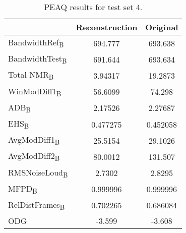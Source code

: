 \begin{table}\begin{center} %
\caption{PEAQ results for test set 4.}
\label{tab:PEAQdata2}
\begin{tabular}{|l|c|c|}
  \hline
                                    & Reconstruction & Original \\ \hline
  BandwidthRef\textsubscript{B}     & 694.777        & 693.638 \\
  BandwidthTest\textsubscript{B}    & 691.644        & 693.634 \\
  Total NMR\textsubscript{B}        & 3.94317        & 19.2873 \\
  WinModDiff1\textsubscript{B}      & 56.6099        & 74.298  \\
  ADB\textsubscript{B}              & 2.17526        & 2.27687 \\
  EHS\textsubscript{B}              & 0.477275       & 0.452058\\
  AvgModDiff1\textsubscript{B}      & 25.5154        & 29.1026 \\
  AvgModDiff2\textsubscript{B}      & 80.0012        & 131.507 \\
  RMSNoiseLoud\textsubscript{B}     & 2.7302         & 2.8295  \\
  MFPD\textsubscript{B}             & 0.999996       & 0.999996\\
  RelDistFrames\textsubscript{B}    & 0.702265       & 0.686084\\
  ODG                               & -3.599         & -3.608\\
  \hline
\end{tabular}
\end{center}\end{table}

